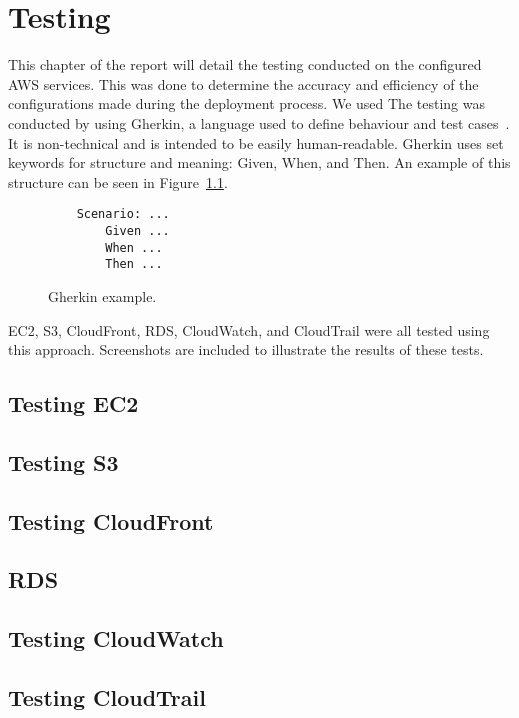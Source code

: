 \chapter{Testing}\label{ch:testing}

This chapter of the report will detail the testing conducted on the configured AWS services.
This was done to determine the accuracy and efficiency of the configurations made during the deployment process.
We used
The testing was conducted by using Gherkin, a language used to define behaviour and test
cases~\parencite{dos2018automated}.
It is non-technical and is intended to be easily human-readable.
Gherkin uses set keywords for structure and meaning: Given, When, and Then.
An example of this structure can be seen in Figure~\ref{fig:gherkin}.

\begin{figure}[!htbp]
    \centering
    \centering
    \begin{verbatim}
    Scenario: ...
        Given ...
        When ...
        Then ...
    \end{verbatim}
    \caption{Gherkin example.}\label{fig:gherkin}
\end{figure}

EC2, S3, CloudFront, RDS, CloudWatch, and CloudTrail were all tested using this approach.
Screenshots are included to illustrate the results of these tests.

\section{Testing EC2}\label{sec:testing_ec2}

\section{Testing S3}\label{sec:testing_s3}

\section{Testing CloudFront}\label{sec:testing_cloudfront}

\section{RDS}\label{sec:rds}

\section{Testing CloudWatch}\label{sec:testing_cloudwatch}

\section{Testing CloudTrail}\label{sec:testing_cloudtrail}
